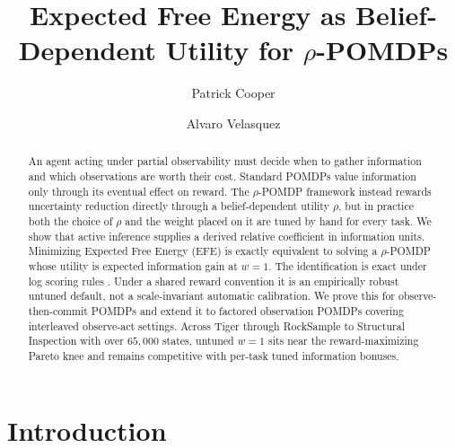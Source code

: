 \documentclass[runningheads]{llncs}
\begin{document}
\title{Expected Free Energy as Belief-Dependent Utility for $\rho$-POMDPs}


\author{Patrick Cooper \and Alvaro Velasquez}



\maketitle

\begin{abstract}
An agent acting under partial observability must decide when to gather information and which observations are worth their cost. Standard POMDPs value information only through its eventual effect on reward. The $\rho$-POMDP framework instead rewards uncertainty reduction directly through a belief-dependent utility $\rho$, but in practice both the choice of $\rho$ and the weight placed on it are tuned by hand for every task. We show that active inference supplies a derived relative coefficient in information units. Minimizing Expected Free Energy (EFE) is exactly equivalent to solving a $\rho$-POMDP whose utility is expected information gain at $w{=}1$. The identification is exact under log scoring rules \citep{bernardo1979}. Under a shared reward convention it is an empirically robust untuned default, not a scale-invariant automatic calibration. We prove this for observe-then-commit POMDPs and extend it to factored observation POMDPs covering interleaved observe-act settings. Across Tiger through RockSample to Structural Inspection with over $65{,}000$ states, untuned $w{=}1$ sits near the reward-maximizing Pareto knee and remains competitive with per-task tuned information bonuses.
\end{abstract}

\section{Introduction}
\end{document}
